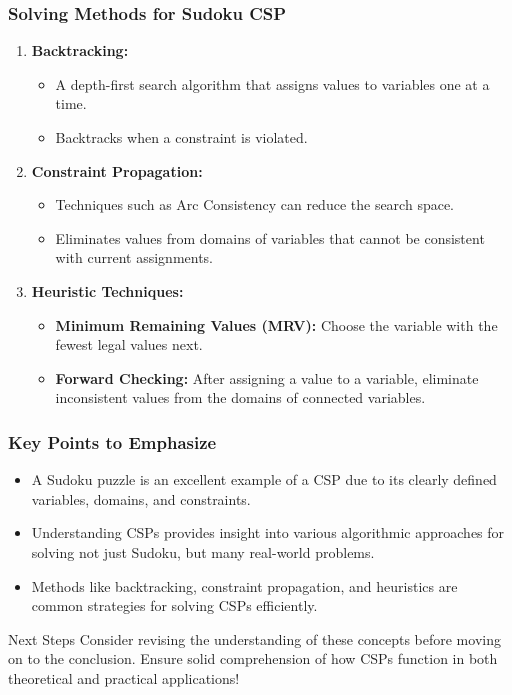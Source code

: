 \documentclass[aspectratio=169]{beamer}
\begin{document}
\begin{frame}[fragile]
    \frametitle{Solving Methods for Sudoku CSP}

    \begin{enumerate}
        \item \textbf{Backtracking:}
        \begin{itemize}
            \item A depth-first search algorithm that assigns values to variables one at a time.
            \item Backtracks when a constraint is violated.
        \end{itemize}

        \item \textbf{Constraint Propagation:}
        \begin{itemize}
            \item Techniques such as Arc Consistency can reduce the search space.
            \item Eliminates values from domains of variables that cannot be consistent with current assignments.
        \end{itemize}

        \item \textbf{Heuristic Techniques:}
        \begin{itemize}
            \item \textbf{Minimum Remaining Values (MRV):} Choose the variable with the fewest legal values next.
            \item \textbf{Forward Checking:} After assigning a value to a variable, eliminate inconsistent values from the domains of connected variables.
        \end{itemize}
    \end{enumerate}
\end{frame}

\begin{frame}[fragile]
    \frametitle{Key Points to Emphasize}

    \begin{itemize}
        \item A Sudoku puzzle is an excellent example of a CSP due to its clearly defined variables, domains, and constraints.
        \item Understanding CSPs provides insight into various algorithmic approaches for solving not just Sudoku, but many real-world problems.
        \item Methods like backtracking, constraint propagation, and heuristics are common strategies for solving CSPs efficiently.
    \end{itemize}
    
    \begin{block}{Next Steps}
        Consider revising the understanding of these concepts before moving on to the conclusion. Ensure solid comprehension of how CSPs function in both theoretical and practical applications!
    \end{block}
\end{frame}
\end{document}
